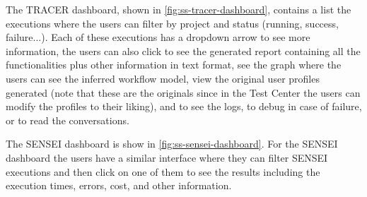 The \ac{TRACER} dashboard,
shown in \autoref{fig:ss-tracer-dashboard},
contains a list the executions
where the users can filter by project and status (running, success, failure...).
Each of these executions has a dropdown arrow to see more information,
the users can also click to see the generated report
containing all the functionalities plus other information in text format,
see the graph where the users can see the inferred workflow model,
view the original user profiles generated
(note that these are the originals since in the Test Center
the users can modify the profiles to their liking),
and to see the logs, to debug in case of failure, or to read the conversations.



The SENSEI dashboard is show in \autoref{fig:ss-sensei-dashboard}.
For the SENSEI dashboard the users have a similar interface
where they can filter SENSEI executions
and then click on one of them to see the results
including the execution times,
errors, cost, and other information.
